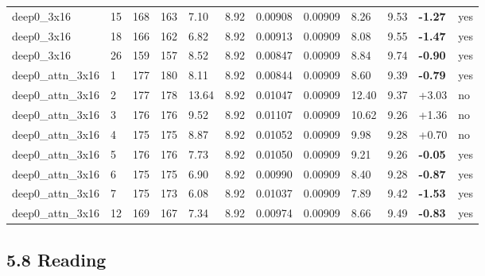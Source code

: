 \documentclass[10pt,a4paper]{article}
\begin{document}
\begin{landscape}
\begin{scriptsize}
\begin{longtable}{llllllllllll}
deep0\_3x16 & 15 & 168 & 163 & 7.10 & 8.92 & 0.00908 & 0.00909 & 8.26 & 9.53 & \textbf{-1.27} & yes \\
deep0\_3x16 & 18 & 166 & 162 & 6.82 & 8.92 & 0.00913 & 0.00909 & 8.08 & 9.55 & \textbf{-1.47} & yes \\
deep0\_3x16 & 26 & 159 & 157 & 8.52 & 8.92 & 0.00847 & 0.00909 & 8.84 & 9.74 & \textbf{-0.90} & yes \\
deep0\_attn\_3x16 & 1 & 177 & 180 & 8.11 & 8.92 & 0.00844 & 0.00909 & 8.60 & 9.39 & \textbf{-0.79} & yes \\
deep0\_attn\_3x16 & 2 & 177 & 178 & 13.64 & 8.92 & 0.01047 & 0.00909 & 12.40 & 9.37 & +3.03 & no \\
deep0\_attn\_3x16 & 3 & 176 & 176 & 9.52 & 8.92 & 0.01107 & 0.00909 & 10.62 & 9.26 & +1.36 & no \\
deep0\_attn\_3x16 & 4 & 175 & 175 & 8.87 & 8.92 & 0.01052 & 0.00909 & 9.98 & 9.28 & +0.70 & no \\
deep0\_attn\_3x16 & 5 & 176 & 176 & 7.73 & 8.92 & 0.01050 & 0.00909 & 9.21 & 9.26 & \textbf{-0.05} & yes \\
deep0\_attn\_3x16 & 6 & 175 & 175 & 6.90 & 8.92 & 0.00990 & 0.00909 & 8.40 & 9.28 & \textbf{-0.87} & yes \\
deep0\_attn\_3x16 & 7 & 175 & 173 & 6.08 & 8.92 & 0.01037 & 0.00909 & 7.89 & 9.42 & \textbf{-1.53} & yes \\
deep0\_attn\_3x16 & 12 & 169 & 167 & 7.34 & 8.92 & 0.00974 & 0.00909 & 8.66 & 9.49 & \textbf{-0.83} & yes \\
\bottomrule \end{longtable}
\end{scriptsize}
\end{landscape}


\subsection*{5.8 Reading}
\end{document}
